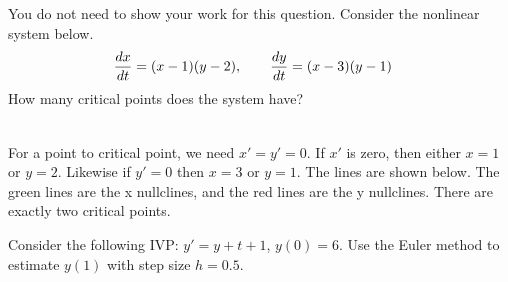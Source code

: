 \ifnum {}    
    \question[1] You do not need to show your work for this question. Consider the nonlinear system below.
    \begin{align*}
        {\frac{dx}{dt}} &= (x-1)(y-2) , \qquad {\frac{dy}{dt}} = (x-3)(y-1)
    \end{align*}
    How many critical points does the system have? \framebox{\strut\hspace{1cm}}
    \ifnum {} {\color{DarkBlue} \\[12pt] 
    For a point to critical point, we need $x' = y' = 0$. If $x'$ is zero, then either $x=1$ or $y=2$. Likewise if $y'=0$ then $x=3$ or $y=1$. The lines are shown below. The green lines are the x nullclines, and the red lines are the y nullclines. There are exactly two critical points. 
        \begin{center}
        \end{center}         
    } 
    \else 
    \vspace{0.5cm}
    \fi    
\fi 


\ifnum {}
\question[2] Consider the following IVP: $y' = y + t+1$, $y(0) = 6$. Use the Euler method to estimate $y(1)$ with step size $h=0.5$.

